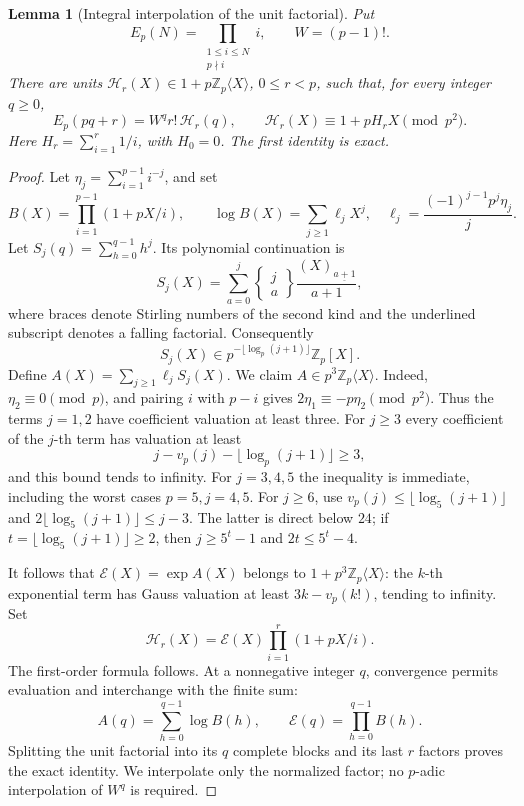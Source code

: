 \documentclass[11pt,a4paper]{article}
\newtheorem{lemma}[theorem]{Lemma}
\theoremstyle{remark}\newtheorem{remark}[theorem]{Remark}
\newcommand{\Z}{\mathbb Z}
\begin{document}
\begin{lemma}[Integral interpolation of the unit factorial]\label{an:unit}
Put
\[
 E_p(N)=\prod_{\substack{1\le i\le N\\p\nmid i}}i,\qquad W=(p-1)!.
\]
There are units \(\mathcal H_r(X)\in1+p\Z_p\langle X\rangle\),
\(0\le r<p\), such that, for every integer \(q\ge0\),
\[
 E_p(pq+r)=W^q r!\,\mathcal H_r(q),\qquad
 \mathcal H_r(X)\equiv1+pH_rX\pmod{p^2}.
\]
Here \(H_r=\sum_{i=1}^r1/i\), with \(H_0=0\). The first identity is exact.
\end{lemma}
\begin{proof}
Let \(\eta_j=\sum_{i=1}^{p-1}i^{-j}\), and set
\[
 B(X)=\prod_{i=1}^{p-1}(1+pX/i),\qquad
 \log B(X)=\sum_{j\ge1}\ell_jX^j,\quad
 \ell_j=\frac{(-1)^{j-1}p^j\eta_j}{j}.
\]
Let \(S_j(q)=\sum_{h=0}^{q-1}h^j\). Its polynomial continuation is
\[
 S_j(X)=\sum_{a=0}^j
 \left\{\begin{matrix}j\\a\end{matrix}\right\}
 \frac{(X)_{\underline{a+1}}}{a+1},
\]
where braces denote Stirling numbers of the second kind and the
underlined subscript denotes a falling factorial. Consequently
\[
 S_j(X)\in p^{-\lfloor\log_p(j+1)\rfloor}\Z_p[X].
\]
Define \(A(X)=\sum_{j\ge1}\ell_jS_j(X)\).
We claim \(A\in p^3\Z_p\langle X\rangle\).
Indeed, \(\eta_2\equiv0\pmod p\), and pairing \(i\) with \(p-i\) gives
\(2\eta_1\equiv-p\eta_2\pmod{p^2}\).
Thus the terms \(j=1,2\) have coefficient valuation at least three.
For \(j\ge3\) every coefficient of the \(j\)-th term has valuation at least
\[
 j-v_p(j)-\lfloor\log_p(j+1)\rfloor\ge3,
\]
and this bound tends to infinity. For \(j=3,4,5\) the inequality is
immediate, including the worst cases \(p=5,j=4,5\). For \(j\ge6\),
use \(v_p(j)\le\lfloor\log_5(j+1)\rfloor\) and
\(2\lfloor\log_5(j+1)\rfloor\le j-3\).
The latter is direct below \(24\); if \(t=\lfloor\log_5(j+1)\rfloor\ge2\),
then \(j\ge5^t-1\) and \(2t\le5^t-4\).

It follows that \(\mathcal E(X)=\exp A(X)\) belongs to
\(1+p^3\Z_p\langle X\rangle\): the \(k\)-th exponential term has
Gauss valuation at least \(3k-v_p(k!)\), tending to infinity.
Set
\[
 \mathcal H_r(X)=\mathcal E(X)\prod_{i=1}^r(1+pX/i).
\]
The first-order formula follows. At a nonnegative integer \(q\),
convergence permits evaluation and interchange with the finite sum:
\[
 A(q)=\sum_{h=0}^{q-1}\log B(h),\qquad
 \mathcal E(q)=\prod_{h=0}^{q-1}B(h).
\]
Splitting the unit factorial into its \(q\) complete blocks and its
last \(r\) factors proves the exact identity. We interpolate only the
normalized factor; no \(p\)-adic interpolation of \(W^q\) is required.
\end{proof}
\end{document}
